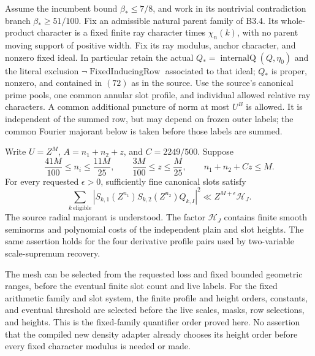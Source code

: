 \begin{proposition}
Assume the incumbent bound $\beta_*\le7/8$, and work in its nontrivial
contradiction branch $\beta_*\ge51/100$. Fix an admissible natural
parent family of B3.4. Its whole-product character is a fixed finite
ray character times $\chi_n(k)$, with no parent moving support of
positive width. Fix its ray modulus, anchor character, and nonzero
fixed ideal. In particular retain the actual
$Q_* = \operatorname{internalQ}(Q,\eta_0)$ and the literal exclusion
$\neg\operatorname{FixedInducingRow}$ associated to that ideal;
$Q_*$ is proper, nonzero, and contained in $(72)$ as in the source.
Use the source's canonical prime pools, one common annular slot profile,
and individual allowed relative ray characters. A common additional
puncture of norm at most $U^B$ is allowed. It is independent of the
summed row, but may depend on frozen outer labels; the common Fourier
majorant below is taken before those labels are summed.

Write $U=Z^M$, $A=n_1+n_2+z$, and $C=2249/500$. Suppose
\[
 \frac{41M}{100}\le n_i\le\frac{11M}{25},\qquad
 \frac{3M}{100}\le z\le\frac M{25},\qquad
 n_1+n_2+Cz\le M.
 \tag{LA.1}
\]
For every requested $\epsilon>0$, sufficiently fine canonical slots
satisfy
\[
 \sum_{k\ \mathrm{eligible}}
   |S_{k,1}(Z^{n_1})S_{k,2}(Z^{n_2})Q_{k,I}|^2
 \ll Z^{M+\epsilon}\mathcal H_J.
 \tag{LA.2}
\]
The source radial majorant is understood. The factor $\mathcal H_J$
contains finite smooth seminorms and polynomial costs of the independent
plain and slot heights. The same assertion holds for the four derivative
profile pairs used by two-variable scale-supremum recovery.

The mesh can be selected from the requested loss and fixed bounded
geometric ranges, before the eventual finite slot count and live labels.
For the fixed arithmetic family and slot system, the finite profile and
height orders, constants, and eventual threshold are selected before
the live scales, masks, row selections, and heights. This is the
fixed-family quantifier order proved here. No assertion that the compiled
new density adapter already chooses its height order before every fixed
character modulus is needed or made.
\end{proposition}

